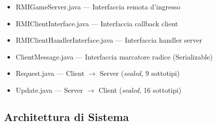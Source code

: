 \documentclass[a4paper,12pt]{article}
\begin{document}
\begin{description}[leftmargin=0pt, font=\ttfamily\bfseries, itemsep=4pt]
  \item[network/rmi/]
    \begin{itemize}[label=\textendash, leftmargin=1.4cm, font=\ttfamily, itemsep=1pt]
      \item RMIGameServer.java --- Interfaccia remota d'ingresso
      \item RMIClientInterface.java --- Interfaccia callback client
      \item RMIClientHandlerInterface.java --- Interfaccia handler server
    \end{itemize}
  \item[network/messages/]
    \begin{itemize}[label=\textendash, leftmargin=1.4cm, font=\ttfamily, itemsep=1pt]
      \item ClientMessage.java --- Interfaccia marcatore radice (Serializable)
      \item Request.java --- Client $\to$ Server (\textit{sealed}, 9 sottotipi)
      \item Update.java --- Server $\to$ Client (\textit{sealed}, 16 sottotipi)
    \end{itemize}
\end{description}

\subsection{Architettura di Sistema}
\end{document}
